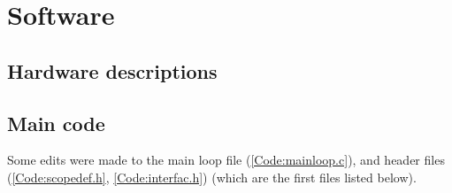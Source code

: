 \documentclass[12pt]{refart} %
\begin{document}
\section{Software} \label{AP:Software} 

\subsection{Hardware descriptions} \label{AP:VHDL}
\begin{fullpage}
	\label{AP:VRAM_FSM.vhd}
	
	
	\label{AP:scopetrig.vhd} 
	 
\end{fullpage}

\subsection{Main code} \label{AP:Code} 
Some edits were made to the main loop file (\ref{Code:mainloop.c}), and header files (\ref{Code:scopedef.h}, \ref{Code:interfac.h}) (which are the first files listed below).

\begin{fullpage}
	
	\label{Code:mainloop.c}
	
	
	\label{Code:scopedef.h}
	
	
	\label{Code:interfac.h}
	 
	
	\label{Code:menu.c}
	
	
	\label{Code:menu.h}
	
	
	\label{Code:menuact.c}
	  
	
	\label{Code:menuact.h}
	 
	
	\label{Code:keyproc.c}
	
	
	\label{Code:keyproc.h}
	  
	
	\label{Code:lcdout.c}
	
	
	\label{Code:lcdout.h}
	
	
	\label{Code:tracutil.c}
	
	
	\label{Code:tracutil.h}
	  
		
	\label{Code:char57.c}
	     
\end{fullpage}

\printindex 
\end{document}
